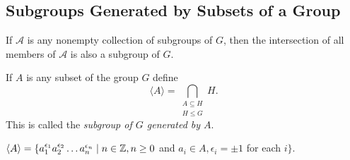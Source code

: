 \documentclass[../main]{subfiles}
\begin{document}
 
 \subsection{Subgroups Generated by Subsets of a Group}
 
 
 \begin{prop}
  If $\mathcal{A}$ is any nonempty collection of subgroups of $G$, then the intersection of all members of $\mathcal{A}$ is also a subgroup of $G$.
 \end{prop}

 
 \begin{dfn}
  If $A$ is any subset of the group $G$ define
   \[\langle A \rangle = \bigcap\limits_{\substack{A \subseteq H \\ H\leq G}} H.\]
  This is called the \textit{subgroup of $G$ generated by $A$}.
 \end{dfn}
 
 
 \begin{nt}
  $\langle A \rangle = \{a_1^{\epsilon_1} a_2^{\epsilon_2}\ldots a_n^{\epsilon_n} \mid n\in \mathbb{Z}, n\geq 0$ and $a_i\in A, \epsilon_i = \pm 1$ for each $i\}$.
 \end{nt}
\end{document}
